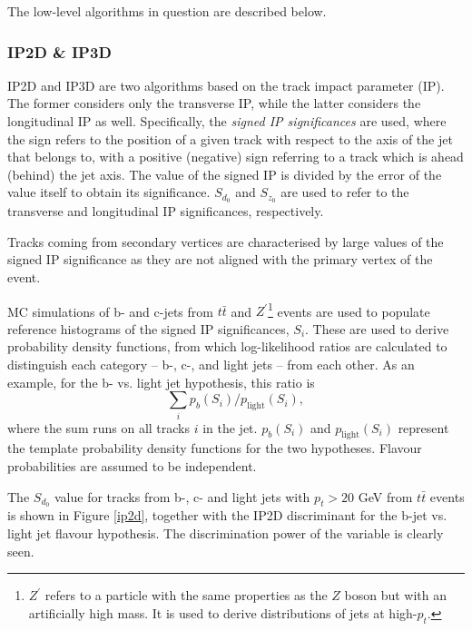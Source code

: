 \documentclass[10pt,a4paper]{book}
\begin{document}
The low-level algorithms in question are described below.

\subsubsection{IP2D \& IP3D}
\label{IP algos}

IP2D and IP3D are two algorithms based on the track impact parameter (IP). The former considers only the transverse IP, while the latter considers the longitudinal IP as well. Specifically, the \emph{signed IP significances} are used, where the sign refers to the position of a given track with respect to the axis of the jet that belongs to, with a positive (negative) sign referring to a track which is ahead (behind) the jet axis. The value of the signed IP is divided by the error of the value itself to obtain its significance. $S_{d_0}$ and $S_{z_0}$ are used to refer to the transverse and longitudinal IP significances, respectively.

Tracks coming from secondary vertices are characterised by large values of the signed IP significance as they are not aligned with the primary vertex of the event. 

MC simulations of b- and c-jets from $t\bar{t}$ and $Z^\prime$\footnote{$Z^\prime$ refers to a particle with the same properties as the $Z$ boson but with an artificially high mass. It is used to derive distributions of jets at high-$p_t$.} events are used to populate reference histograms of the signed IP significances, $S_i$. These are used to derive probability density functions, from which log-likelihood ratios are calculated to distinguish each category -- b-, c-, and light jets -- from each other. As an example, for the b- vs. light jet hypothesis, this ratio is
\begin{equation}
    \sum_i p_b(S_i)/p_\text{light}(S_i),
\end{equation}
where the sum runs on all tracks $i$ in the jet. $p_b(S_i)$ and $p_\text{light}(S_i)$ represent the template probability density functions for the two hypotheses. Flavour probabilities are assumed to be independent. 

The $S_{d_0}$ value for tracks from b-, c- and light jets with $p_t > 20$ GeV from $t\bar{t}$ events is shown in Figure \ref{ip2d}, together with the IP2D discriminant for the b-jet vs. light jet flavour hypothesis. The discrimination power of the variable is clearly seen.
\end{document}
